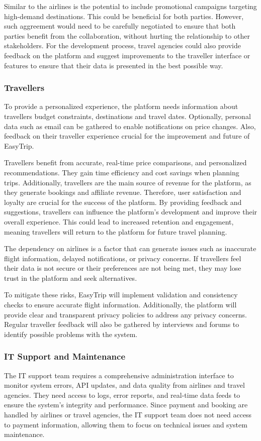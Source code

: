 Similar to the airlines is the potential to include promotional campaigns targeting high-demand destinations. This could be beneficial for both parties. However, such aggreement would need to be carefully negotiated to ensure that both parties benefit from the collaboration, without hurting the relationship to other stakeholders. For the development process, travel agencies could also provide feedback on the platform and suggest improvements to the traveller interface or features to ensure that their data is presented in the best possible way.

\subsubsection{Travellers}
To provide a personalized experience, the platform needs information about travellers budget constraints, destinations and travel dates. Optionally, personal data such as email can be gathered to enable notifications on price changes. Also, feedback on their traveller experience crucial for the improvement and future of EasyTrip.


Travellers benefit from accurate, real-time price comparisons, and personalized recommendations. They gain time efficiency and cost savings when planning trips. Additionally, travellers are the main source of revenue for the platform, as they generate bookings and affiliate revenue. Therefore, user satisfaction and loyalty are crucial for the success of the platform. By providing feedback and suggestions, travellers can influence the platform's development and improve their overall experience. This could lead to increased retention and engagement, meaning travellers will return to the platform for future travel planning.


The dependency on airlines is a factor that can generate issues such as inaccurate flight information, delayed notifications, or privacy concerns. If travellers feel their data is not secure or their preferences are not being met, they may lose trust in the platform and seek alternatives.

To mitigate these risks, EasyTrip will implement validation and consistency checks to ensure accurate flight information. Additionally, the platform will provide clear and transparent privacy policies to address any privacy concerns. Regular traveller feedback will also be gathered by interviews and forums to identify possible problems with the system. 

\subsubsection{IT Support and Maintenance}
The IT support team requires a comprehensive administration interface to monitor system errors, API updates, and data quality from airlines and travel agencies. They need access to logs, error reports, and real-time data feeds to ensure the system's integrity and performance. Since payment and booking are handled by airlines or travel agencies, the IT support team does not need access to payment information, allowing them to focus on technical issues and system maintenance.


